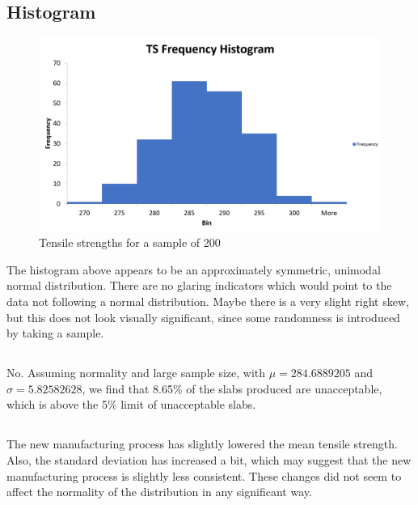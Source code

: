 \documentclass[letterpaper]{article}
\begin{document}
\subsection{Histogram}
\begin{figure}[H]
 \centering
 \includegraphics[width=\textwidth]{histogram.png}
 \caption{Tensile strengths for a sample of 200}
 \label{histogram}
\end{figure}

The histogram above appears to be an approximately symmetric, unimodal normal
distribution. There are no glaring indicators which would point to the data not
following a normal distribution. Maybe there is a very slight right skew, but
this does not look visually significant, since some randomness is introduced by
taking a sample.

\subsection{} %
No. Assuming normality and large sample size, with $\mu = 284.6889205$ and
$\sigma = 5.82582628$, we find that 8.65\% of the slabs produced are
unacceptable, which is above the 5\% limit of unacceptable slabs.

\subsection{} %
The new manufacturing process has slightly lowered the mean tensile strength.
Also, the standard deviation has increased a bit, which may suggest that the new
manufacturing process is slightly less consistent. These changes did not seem to
affect the normality of the distribution in any significant way.
\end{document}
